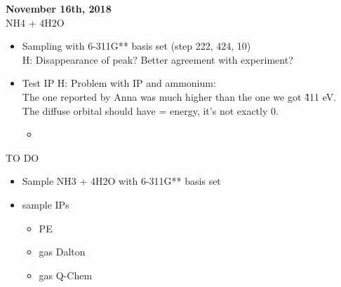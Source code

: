\documentclass{article}
\begin{document}
\textbf{November 16th, 2018 }\\

NH4 + 4H2O 
\begin{itemize}
\item Sampling with 6-311G** basis set (step 222, 424, 10)\\
H: Disappearance of peak? Better agreement with experiment?
\item Test IP 
H: Problem with IP and ammonium:\\
The one reported by Anna was much higher than the one we got \~ 411 eV.\\
The diffuse orbital should have = energy, it's not exactly 0.
\begin{itemize}
\item 
\end{itemize}
\end{itemize}

TO DO
\begin{itemize}
\item Sample NH3 + 4H2O with 6-311G** basis set
\item sample IPs
\begin{itemize}
\item PE %
\item gas Dalton%
\item gas Q-Chem %
\end{itemize}
\end{itemize}
\end{document}
